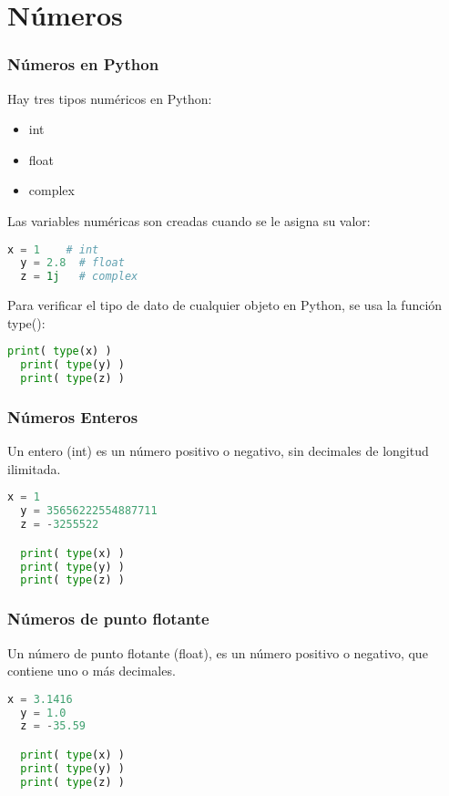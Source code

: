 \section{Números}

\begin{frame}[fragile]
  \frametitle{Números en Python}

  \vspace{\baselineskip}
  Hay tres tipos numéricos en Python:

  \begin{itemize}
    \item \textcolor{codeKeyword2}{int}
    \item \textcolor{codeKeyword2}{float}
    \item \textcolor{codeKeyword2}{complex}
  \end{itemize}

  Las variables numéricas son creadas cuando se le asigna su valor:

  \begin{lstlisting}[language=Python]
  x = 1    # int
  y = 2.8  # float
  z = 1j   # complex
  \end{lstlisting}

  \pausa
  Para verificar el tipo de dato de cualquier objeto en Python, se usa la
  función \textcolor{codeKeyword2}{type}():

  \begin{lstlisting}[language=Python]
  print( type(x) )
  print( type(y) )
  print( type(z) )
  \end{lstlisting}
\end{frame}

\begin{frame}[fragile]
  \frametitle{Números Enteros}

  Un entero (\textcolor{codeKeyword2}{int}) es un número positivo o
  negativo, sin decimales de longitud ilimitada.

  \vspace{\baselineskip}
  \begin{lstlisting}[language=Python]
  x = 1
  y = 35656222554887711
  z = -3255522

  print( type(x) )
  print( type(y) )
  print( type(z) )
  \end{lstlisting}
\end{frame}

\begin{frame}[fragile]
  \frametitle{Números de punto flotante}

  Un número de punto flotante (\textcolor{codeKeyword2}{float}), es un número
  positivo o negativo, que contiene uno o más decimales.

  \vspace{\baselineskip}
  \begin{lstlisting}[language=Python]
  x = 3.1416
  y = 1.0
  z = -35.59

  print( type(x) )
  print( type(y) )
  print( type(z) )
  \end{lstlisting}
\end{frame}


